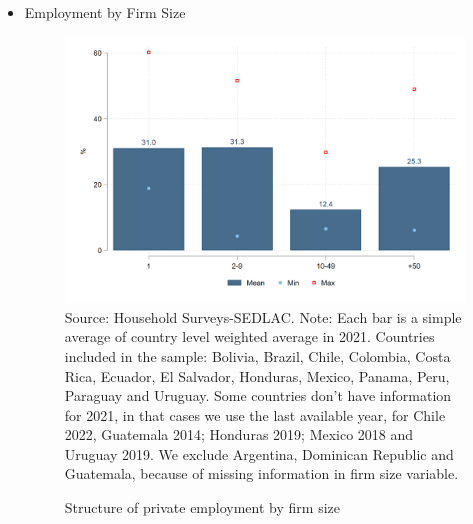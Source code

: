 \documentclass[english]{article}
\begin{document}
\begin{itemize}
        
\item Employment by Firm Size
\begin{figure}[!htb]
        \justifying
        \caption{Structure of private employment by firm size}     
        \includegraphics[scale=.3]{latex/figures/Snapshot/Structure of employment by firm size.png}
        \label{fig:firmsize}
        \footnotesize{Source: Household Surveys-SEDLAC.}
        \footnotesize{Note: Each bar is a simple average of country level weighted average in 2021. Countries included in the sample: Bolivia, Brazil, Chile, Colombia, Costa Rica, Ecuador, El Salvador, Honduras, Mexico, Panama, Peru, Paraguay and Uruguay. Some countries don’t have information for 2021, in that cases we use the last available year, for Chile 2022, Guatemala 2014; Honduras 2019; Mexico 2018 and Uruguay 2019. We exclude Argentina, Dominican Republic and Guatemala, because of missing information in firm size variable.}
        \end{figure}



\end{itemize}
\end{document}
